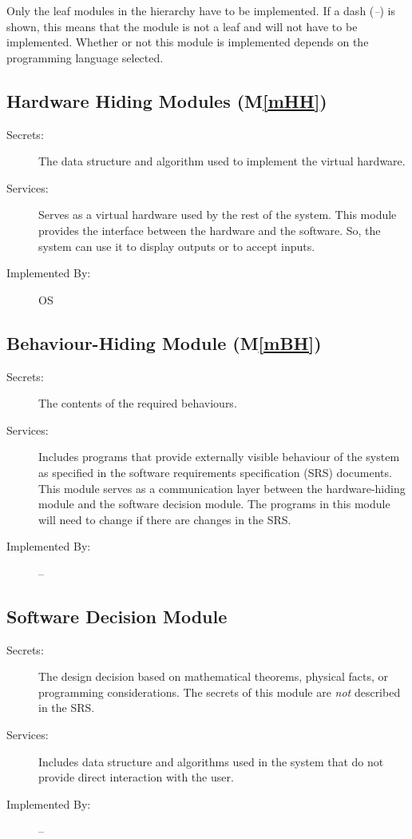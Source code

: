 \documentclass[12pt, titlepage]{article}
\newcommand{\mref}[1]{M\ref{#1}}
\begin{document}
Only the leaf modules in the
hierarchy have to be implemented. If a dash (\emph{--}) is shown, this means
that the module is not a leaf and will not have to be implemented. Whether or
not this module is implemented depends on the programming language
selected.

\subsection{Hardware Hiding Modules (\mref{mHH})}

\begin{description}
\item[Secrets:]The data structure and algorithm used to implement the virtual
  hardware.
\item[Services:]Serves as a virtual hardware used by the rest of the
  system. This module provides the interface between the hardware and the
  software. So, the system can use it to display outputs or to accept inputs.
\item[Implemented By:] OS
\end{description}

\subsection{Behaviour-Hiding Module (\mref{mBH})}

\begin{description}
\item[Secrets:]The contents of the required behaviours.
\item[Services:]Includes programs that provide externally visible behaviour of
  the system as specified in the software requirements specification (SRS)
  documents. This module serves as a communication layer between the
  hardware-hiding module and the software decision module. The programs in this
  module will need to change if there are changes in the SRS.
\item[Implemented By:] --
\end{description}

\subsection{Software Decision Module}

\begin{description}
\item[Secrets:] The design decision based on mathematical theorems, physical
  facts, or programming considerations. The secrets of this module are
  \emph{not} described in the SRS.
\item[Services:] Includes data structure and algorithms used in the system that
  do not provide direct interaction with the user. 
\item[Implemented By:] --
\end{description}
\end{document}
